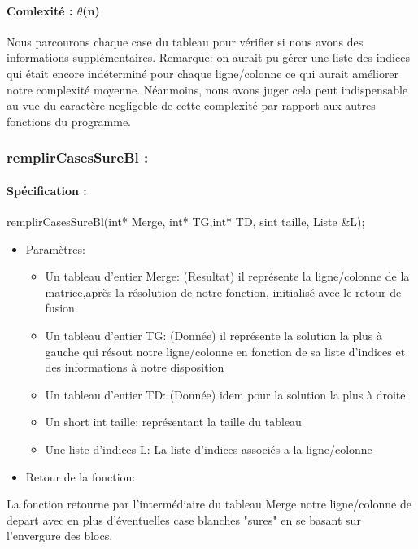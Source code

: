 \documentclass{article}
\begin{document}
\paragraph{Comlexité : $\theta$(n)\newline}
Nous parcourons chaque case du tableau pour vérifier si nous avons des informations supplémentaires. Remarque: on aurait pu gérer une liste des indices qui était encore indéterminé pour chaque ligne/colonne ce qui aurait améliorer notre complexité moyenne. 
Néanmoins, nous avons juger cela peut indispensable au vue du caractère negligeble de cette complexité par rapport aux autres fonctions du programme. 
\subsubsection{remplirCasesSureBl :}
\paragraph{Spécification :}remplirCasesSureBl(int* Merge, int* TG,int* TD, sint taille, Liste \&L);
\begin{itemize}
\item Paramètres:
\begin{itemize}
\item Un tableau d'entier Merge: (Resultat) il représente la ligne/colonne de la matrice,après la résolution de notre fonction, initialisé avec le retour de fusion.
\item Un tableau d'entier TG: (Donnée) il représente la solution la plus à gauche qui résout notre ligne/colonne en fonction de sa liste d'indices et des informations à notre disposition
\item Un tableau d'entier TD: (Donnée) idem pour la solution la plus à droite
\item Un short int taille: représentant la taille du tableau
\item Une liste d'indices L: La liste d'indices associés a la ligne/colonne
\end{itemize}
\item Retour de la fonction:
\end{itemize}
La fonction retourne par l'intermédiaire du tableau Merge notre ligne/colonne de depart avec en plus d'éventuelles case blanches "sures" en se basant sur l'envergure des blocs.
\end{document}
